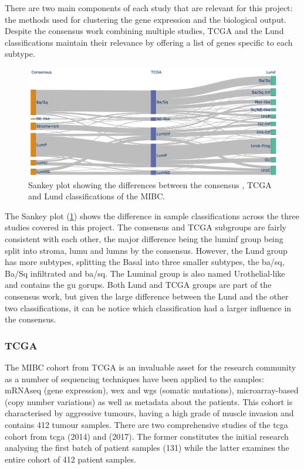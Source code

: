 There are two main components of each study that are relevant for this project: the methods used for clustering the gene expression and the biological output. Despite the consensus work combining multiple studies, TCGA and the Lund classifications maintain their relevance by offering a list of genes specific to each subtype. 

\begin{figure}[!htb]   
\centering
\includegraphics[width=1.0\textwidth,height=1.0\textheight,keepaspectratio]{Sections/Lit_review/Resources/classifier_differences.png}
  \caption{Sankey plot showing the differences between the consensus \citet{Kamoun2020-tj}, TCGA \citet{Robertson2017-mg} and Lund \citet{Marzouka2018-ge} classifications of the MIBC.}
\label{fig:lit:classifier_comp}
\end{figure}

The Sankey plot (\cref{fig:lit:classifier_comp}) shows the difference in sample classifications across the three studies covered in this project. The consensus and TCGA subgroups are fairly consistent with each other, the major difference being the \acrfull{luminf} group being split into \acrfull{stroma}, \acrfull{lumu} and \acrfull{lumns} by the consensus. However, the Lund group has more subtypes, splitting the Basal into three smaller subtypes, the \acrfull{ba/sq}, Ba/Sq infiltrated and \acrfull{ba/sq}. The Luminal group is also named Urothelial-like and contains the \acrfull{gu} gorups. Both Lund and TCGA groups are part of the consensus work, but given the large difference between the Lund and the other two classifications, it can be notice which classification had a larger influence in the consensus.


\subsubsection*{TCGA} \label{s:lit:tcga_mibc}

The MIBC cohort from TCGA is an invaluable asset for the research community as a number of sequencing techniques have been applied to the samples: mRNAseq (gene expression), \acrfull{wex} and \acrfull{wgs} (somatic mutations), microarray-based (copy number variations) as well as metadata about the patients. This cohort is characterised by aggressive tumours, having a high grade of muscle invasion and contains 412 tumour samples. There are two comprehensive studies of the \acrlong{tcga} cohort from \acrfull{tcga} \citet{Tcga2014-dr} (2014) and \citet{Robertson2017-mg} (2017). The former constitutes the initial research analysing the first batch of patient samples (131) while the latter examines the entire cohort of 412 patient samples. 

